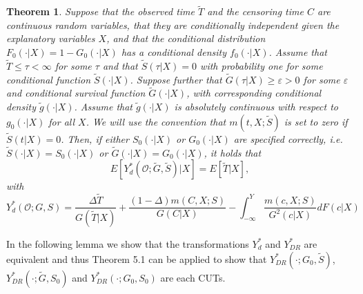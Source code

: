 \documentclass[12pt, a4paper]{scrartcl}
\theoremstyle{definition}
\theoremstyle{plain}
\newtheorem{Theorem}{Theorem}[section]
\numberwithin{equation}{section}
\numberwithin{figure}{section}
\numberwithin{table}{section}
\begin{document}
	\begin{Theorem}\label{thm:dr}
		Suppose that the observed time $\tilde T$ and the censoring time $C$ are continuous random variables, that they are conditionally independent given the explanatory variables $X$, and that the conditional distribution $F_0(\cdot \vert X) = 1 - G_0(\cdot \vert X)$ has a conditional density $f_0(\cdot \vert X)$.
		Assume that $\tilde T \leq \tau < \infty$ for some $\tau$ and that $\tilde{S}(\tau \vert X)=0$ with probability one for some conditional function $\tilde{S}(\cdot \vert X)$.
		Suppose further that $\tilde{G}(\tau \vert X)\geq \varepsilon > 0$ for some $\varepsilon$ and conditional survival function $\tilde{G}(\cdot \vert X)$, with corresponding conditional density $\tilde{g}(\cdot\vert X)$.
		Assume that $\tilde{g}(\cdot\vert X)$ is absolutely continuous with respect to $g_0(\cdot\vert X)$ for all $X$.
		We will use the convention that $m(t,X;\tilde{S})$ is set to zero if $\tilde{S}(t \vert X)=0$.
		Then, if either $S_0(\cdot\vert X)$ or $G_0(\cdot\vert X)$ are specified correctly, i.e. $\tilde{S}(\cdot\vert X)=S_0(\cdot\vert X)$ or $\tilde{G}(\cdot\vert X)=G_0(\cdot\vert X)$, it holds that
		\begin{equation*}
		E[Y_{d}^*(\mathcal{O};\tilde{G}, \tilde{S})\vert X] = E[\tilde T \vert X],
		\end{equation*}
		with 
		\begin{equation}\label{eq:drcut2}
		Y_d^*(\mathcal{O}; G,S) = \frac{\Delta \tilde T}{G(\tilde T\vert X)}+\frac{(1-\Delta)m(C,X;S)}{G(C \vert X)}-\int_{-\infty}^{Y}\frac{m(c,X;S)}{G^2(c\vert X)}dF(c\vert X)
		\end{equation}
	\end{Theorem}
	In the following lemma we show that the transformations $Y_d^*$ and $Y_{DR}^*$ are equivalent and thus Theorem 5.1 can be applied to show that $Y_{DR}^*(\cdot; G_0, \tilde{S})$, $Y_{DR}^*(\cdot; \tilde{G}, S_0)$ and $Y_{DR}^*(\cdot; G_0, S_0)$ are each CUTs.
	
\end{document}
